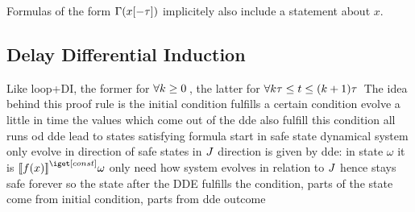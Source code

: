 \documentclass[10pt]{report}
\begin{document}
        \begin{calculus}
        \end{calculus}

        Formulas of the form $\Gamma(x[-\tau])$ implicitely also include a statement about $x$.

    \subsection{Delay Differential Induction}
        \label{sec:delay-differential-induction}

        Like loop+DI, the former for $\lforall{k\geq 0}$, the latter for $\lforall{k\tau\leq t \leq (k+1)\tau}$
        The idea behind this proof rule is
        the initial condition fulfills a certain condition
        evolve a little in time
        the values which come out of the dde also fulfill this condition
        all runs od dde lead to states satisfying formula
        start in safe state
        dynamical system only evolve in direction of safe states in $J$
        direction is given by dde: in state $\omega$ it is $\imodel{}{f(x)}\omega$
        only need how system evolves in relation to $J$
        hence stays safe forever
        so the state after the DDE fulfills the condition, parts of the state come from initial condition, parts from dde outcome

        \begin{calculus}
        \end{calculus}
\end{document}
